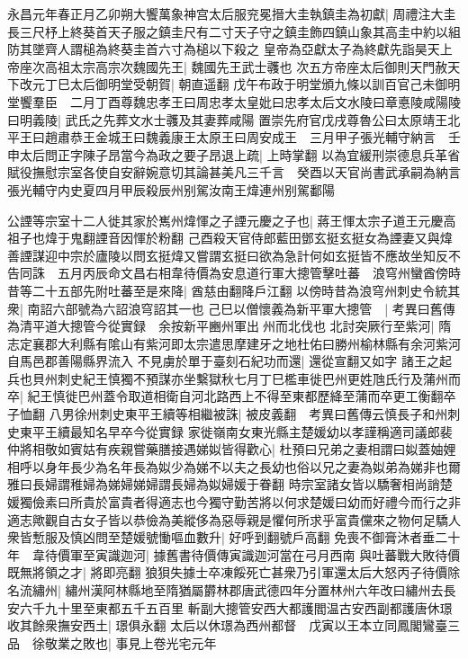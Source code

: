 永昌元年春正月乙卯朔大饗萬象神宫太后服兖冕搢大圭執鎮圭為初獻|{
	周禮注大圭長三尺杼上終葵首天子服之鎮圭尺有二寸天子守之鎮圭飾四鎮山象其高圭中約以組防其墜齊人謂槌為終葵圭首六寸為槌以下殺之}
皇帝為亞獻太子為終獻先詣昊天上帝座次高祖太宗高宗次魏國先王|{
	魏國先王武士彠也}
次五方帝座太后御則天門赦天下改元丁巳太后御明堂受朝賀|{
	朝直遥翻}
戊午布政于明堂頒九條以訓百官己未御明堂饗羣臣　二月丁酉尊魏忠孝王曰周忠孝太皇妣曰忠孝太后文水陵曰章悳陵咸陽陵曰明義陵|{
	武氏之先葬文水士彠及其妻葬咸陽}
置崇先府官戊戌尊魯公曰太原靖王北平王曰趙肅恭王金城王曰魏義康王太原王曰周安成王　三月甲子張光輔守納言　壬申太后問正字陳子昂當今為政之要子昂退上疏|{
	上時掌翻}
以為宜緩刑崇德息兵革省賦役撫慰宗室各使自安辭婉意切其論甚美凡三千言　癸酉以天官尚書武承嗣為納言張光輔守内史夏四月甲辰殺辰州别駕汝南王煒連州别駕鄱陽

公諲等宗室十二人徙其家於嶲州煒惲之子諲元慶之子也|{
	蔣王惲太宗子道王元慶高祖子也煒于鬼翻諲音因惲於粉翻}
己酉殺天官侍郎藍田鄧玄挺玄挺女為諲妻又與煒善諲謀迎中宗於廬陵以問玄挺煒又嘗謂玄挺曰欲為急計何如玄挺皆不應故坐知反不告同誅　五月丙辰命文昌右相韋待價為安息道行軍大摠管擊吐蕃　浪穹州蠻酋傍時昔等二十五部先附吐蕃至是來降|{
	酋慈由翻降戶江翻}
以傍時昔為浪穹州刺史令統其衆|{
	南詔六部號為六詔浪穹詔其一也}
己巳以僧懷義為新平軍大摠管　|{
	考異曰舊傳為清平道大摠管今從實録　余按新平豳州軍出州而北伐也}
北討突厥行至紫河|{
	隋志定襄郡大利縣有隂山有紫河即太宗遣思摩建牙之地杜佑曰勝州榆林縣有余河紫河自馬邑郡善陽縣界流入}
不見虜於單于臺刻石紀功而還|{
	還從宣翻又如字}
諸王之起兵也貝州刺史紀王慎獨不預謀亦坐繫獄秋七月丁巳檻車徙巴州更姓虺氏行及蒲州而卒|{
	紀王慎徙巴州蓋令取道相衛自河北路西上不得至東都歷絳至蒲而卒更工衡翻卒子恤翻}
八男徐州刺史東平王續等相繼被誅|{
	被皮義翻　考異曰舊傳云慎長子和州刺史東平王續最知名早卒今從實録}
家徙嶺南女東光縣主楚媛幼以孝謹稱適司議郎裴仲將相敬如賓姑有疾親嘗藥膳接遇娣姒皆得歡心|{
	杜預曰兄弟之妻相謂曰姒蓋妯娌相呼以身年長少為名年長為姒少為娣不以夫之長幼也俗以兄之妻為姒弟為娣非也爾雅曰長婦謂稚婦為娣婦娣婦謂長婦為姒婦媛于眷翻}
時宗室諸女皆以驕奢相尚誚楚媛獨儉素曰所貴於富貴者得適志也今獨守勤苦將以何求楚媛曰幼而好禮今而行之非適志歟觀自古女子皆以恭儉為美縱侈為惡辱親是懼何所求乎富貴儻來之物何足驕人衆皆慙服及慎凶問至楚媛號慟嘔血數升|{
	好呼到翻號戶高翻}
免喪不御膏沐者垂二十年　韋待價軍至寅識迦河|{
	據舊書待價傳寅識迦河當在弓月西南}
與吐蕃戰大敗待價既無將領之才|{
	將即亮翻}
狼狽失據士卒凍餒死亡甚衆乃引軍還太后大怒丙子待價除名流繡州|{
	繡州漢阿林縣地至隋猶屬欝林郡唐武德四年分置林州六年改曰繡州去長安六千九十里至東都五千五百里}
斬副大摠管安西大都護閻温古安西副都護唐休璟收其餘衆撫安西土|{
	璟俱永翻}
太后以休璟為西州都督　戊寅以王本立同鳳閣鸞臺三品　徐敬業之敗也|{
	事見上卷光宅元年}
